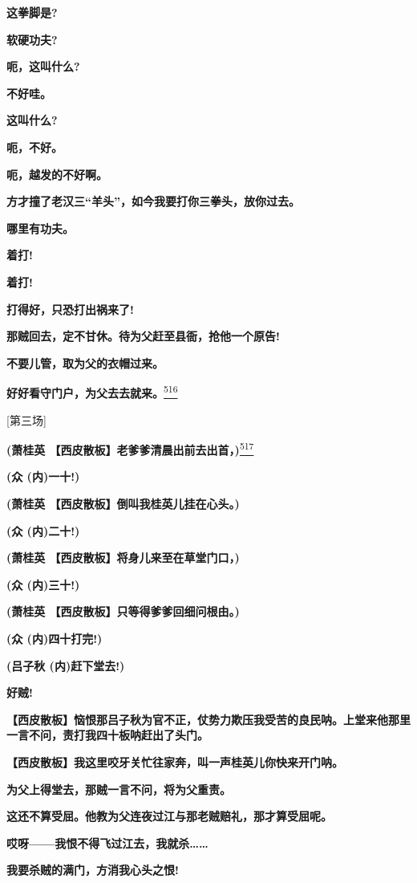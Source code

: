 \textbf{这拳脚是?}

\textbf{软硬功夫?}

\textbf{呃，这叫什么?}

\textbf{不好哇。}

\textbf{这叫什么?}

\textbf{呃，不好。}

\textbf{呃，越发的不好啊。}

\textbf{方才撞了老汉三``羊头''，如今我要打你三拳头，放你过去。}

\textbf{哪里有功夫。}

\textbf{着打!}

\textbf{着打!}

\textbf{打得好，只恐打出祸来了!}

\textbf{那贼回去，定不甘休。待为父赶至县衙，抢他一个原告!}

\textbf{不要儿管，取为父的衣帽过来。}

\textbf{好好看守门户，为父去去就来。}\protect\hyperlink{fn516}{\textsuperscript{516}}

{[}第三场{]}

\textbf{(萧桂英
【西皮散板】老爹爹清晨出前去出首，)}\protect\hyperlink{fn517}{\textsuperscript{517}}

\textbf{(众 (内)一十!)}

\textbf{(萧桂英 【西皮散板】倒叫我桂英儿挂在心头。)}

\textbf{(众 (内)二十!)}

\textbf{(萧桂英 【西皮散板】将身儿来至在草堂门口，)}

\textbf{(众 (内)三十!)}

\textbf{(萧桂英 【西皮散板】只等得爹爹回细问根由。)}

\textbf{(众 (内)四十打完!)}

\textbf{(吕子秋 (内)赶下堂去!)}

\textbf{好贼!}

\textbf{【西皮散板】恼恨那吕子秋为官不正，仗势力欺压我受苦的良民呐。上堂来他那里一言不问，责打我四十板呐赶出了头门。}

\textbf{【西皮散板】我这里咬牙关忙往家奔，叫一声桂英儿你快来开门呐。}

\textbf{为父上得堂去，那贼一言不问，将为父重责。}

\textbf{这还不算受屈。他教为父连夜过江与那老贼赔礼，那才算受屈呢。}

\textbf{哎呀------我恨不得飞过江去，我就杀\ldots{}\ldots{}}

\textbf{我要杀贼的满门，方消我心头之恨!}

